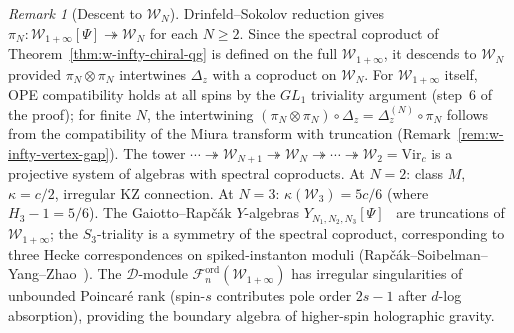 \documentclass[11pt,reqno]{amsart}
\theoremstyle{definition}
\theoremstyle{remark}
\newtheorem{remark}[theorem]{Remark}
\newcommand{\cD}{\mathcal{D}}
\newcommand{\cF}{\mathcal{F}}
\newcommand{\cW}{\mathcal{W}}
\numberwithin{equation}{section}
\begin{document}
\begin{remark}[Descent to $\cW_N$]
\label{rem:w-infty-descent}
Drinfeld--Sokolov reduction gives
$\pi_N \colon \cW_{1+\infty}[\Psi]
\twoheadrightarrow \cW_N$
for each $N \geq 2$. Since the spectral coproduct of
Theorem~\ref{thm:w-infty-chiral-qg} is defined
on the full $\cW_{1+\infty}$, it descends to $\cW_N$
provided $\pi_N \otimes \pi_N$ intertwines $\Delta_z$ with
a coproduct on $\cW_N$. For $\cW_{1+\infty}$ itself,
OPE compatibility holds at all spins by the $GL_1$
triviality argument (step~6 of the proof); for finite
$N$, the intertwining $(\pi_N \otimes \pi_N) \circ
\Delta_z = \Delta_z^{(N)} \circ \pi_N$ follows from the
compatibility of the Miura transform with truncation
(Remark~\ref{rem:w-infty-vertex-gap}).
The tower
$\cdots \twoheadrightarrow \cW_{N+1}
\twoheadrightarrow \cW_N
\twoheadrightarrow \cdots
\twoheadrightarrow \cW_2 = \mathrm{Vir}_c$
is a projective system of algebras with spectral
coproducts.
At $N = 2$: class $M$, $\kappa = c/2$, irregular KZ
connection. At $N = 3$: $\kappa(\cW_3) = 5c/6$ (where
$H_3 - 1 = 5/6$).
The Gaiotto--Rap\v{c}\'ak $Y$-algebras
$Y_{N_1,N_2,N_3}[\Psi]$~\cite{GR17} are truncations of
$\cW_{1+\infty}$; the $S_3$-triality is a symmetry
of the spectral coproduct, corresponding to three Hecke
correspondences on spiked-instanton moduli
(Rap\v{c}\'ak--Soibelman--Yang--Zhao~\cite{RSYZ20}).
The $\cD$-module $\cF_n^{\mathrm{ord}}(\cW_{1+\infty})$
has irregular singularities of unbounded Poincar\'e rank
(spin-$s$ contributes pole order $2s - 1$ after $d$-log
absorption), providing the boundary algebra of higher-spin
holographic gravity.
\end{remark}
\end{document}
